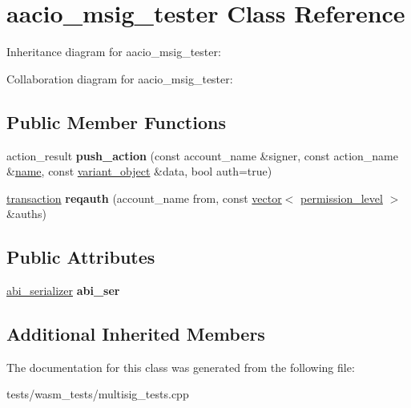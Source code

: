 \hypertarget{classaacio__msig__tester}{}\section{aacio\+\_\+msig\+\_\+tester Class Reference}
\label{classaacio__msig__tester}


Inheritance diagram for aacio\+\_\+msig\+\_\+tester\+:


Collaboration diagram for aacio\+\_\+msig\+\_\+tester\+:
\subsection*{Public Member Functions}
\begin{DoxyCompactItemize}
\item 
\mbox{\label{classaacio__msig__tester_ac84cf93ab4efbc317b01ca99199ed84a}} 
action\+\_\+result {\bfseries push\+\_\+action} (const account\+\_\+name \&signer, const action\+\_\+name \&\mbox{\hyperlink{structaacio_1_1name}{name}}, const \mbox{\hyperlink{classfc_1_1variant__object}{variant\+\_\+object}} \&data, bool auth=true)
\item 
\mbox{\label{classaacio__msig__tester_a6327d2d7dd081da6422a7753abf74a13}} 
\mbox{\hyperlink{classaacio_1_1transaction}{transaction}} {\bfseries reqauth} (account\+\_\+name from, const \mbox{\hyperlink{classstd_1_1vector}{vector}}$<$ \mbox{\hyperlink{structaacio_1_1permission__level}{permission\+\_\+level}} $>$ \&auths)
\end{DoxyCompactItemize}
\subsection*{Public Attributes}
\begin{DoxyCompactItemize}
\item 
\mbox{\label{classaacio__msig__tester_a09a4e3aad2b587b5d58e94f4e835ce66}} 
\mbox{\hyperlink{structaacio_1_1chain_1_1contracts_1_1abi__serializer}{abi\+\_\+serializer}} {\bfseries abi\+\_\+ser}
\end{DoxyCompactItemize}
\subsection*{Additional Inherited Members}


The documentation for this class was generated from the following file\+:\begin{DoxyCompactItemize}
\item 
tests/wasm\+\_\+tests/multisig\+\_\+tests.\+cpp\end{DoxyCompactItemize}

